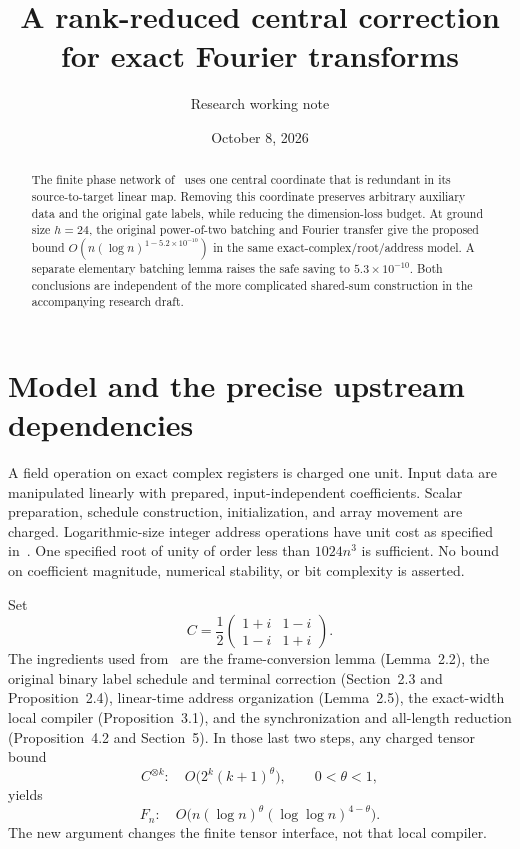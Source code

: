 \documentclass[11pt]{article}
\title{A rank-reduced central correction\protect\\for exact Fourier transforms}
\author{Research working note}
\date{October 8, 2026}
\begin{document}
\maketitle
\begin{abstract}
The finite phase network of~\cite{O} uses one central coordinate that is redundant in its source-to-target linear map. Removing this coordinate preserves arbitrary auxiliary data and the original gate labels, while reducing the dimension-loss budget. At ground size $h=24$, the original power-of-two batching and Fourier transfer give the proposed bound $O(n(\log n)^{1-5.2\times10^{-10}})$ in the same exact-complex/root/address model. A separate elementary batching lemma raises the safe saving to $5.3\times10^{-10}$. Both conclusions are independent of the more complicated shared-sum construction in the accompanying research draft.
\end{abstract}

\section{Model and the precise upstream dependencies}
A field operation on exact complex registers is charged one unit. Input data are manipulated linearly with prepared, input-independent coefficients. Scalar preparation, schedule construction, initialization, and array movement are charged. Logarithmic-size integer address operations have unit cost as specified in~\cite[Section~1.1]{O}. One specified root of unity of order less than $1024n^3$ is sufficient. No bound on coefficient magnitude, numerical stability, or bit complexity is asserted.

Set
\[
 C=\frac12\begin{pmatrix}1+i&1-i\\1-i&1+i\end{pmatrix}.
\]
The ingredients used from~\cite{O} are the frame-conversion lemma (Lemma~2.2), the original binary label schedule and terminal correction (Section~2.3 and Proposition~2.4), linear-time address organization (Lemma~2.5), the exact-width local compiler (Proposition~3.1), and the synchronization and all-length reduction (Proposition~4.2 and Section~5). In those last two steps, any charged tensor bound
\[
 C^{\otimes k}:\quad O\bigl(2^k(k+1)^\theta\bigr),\qquad 0<\theta<1,
\]
yields
\begin{equation}\label{eq:transfer}
 F_n:\quad O\bigl(n(\log n)^\theta(\log\log n)^{4-\theta}\bigr).
\end{equation}
The new argument changes the finite tensor interface, not that local compiler.
\end{document}
